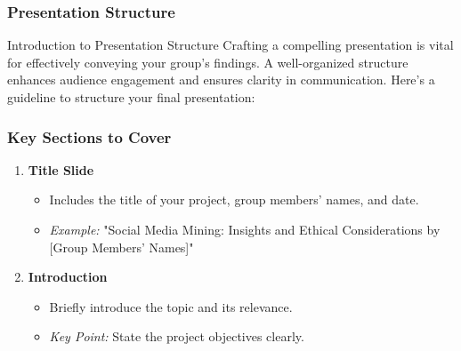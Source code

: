 \documentclass{beamer}
\begin{document}
\begin{frame}[fragile]
    \frametitle{Presentation Structure}
    \begin{block}{Introduction to Presentation Structure}
        Crafting a compelling presentation is vital for effectively conveying your group’s findings. 
        A well-organized structure enhances audience engagement and ensures clarity in communication.
        Here's a guideline to structure your final presentation:
    \end{block}
\end{frame}

\begin{frame}[fragile]
    \frametitle{Key Sections to Cover}
    \begin{enumerate}
        \item \textbf{Title Slide}
            \begin{itemize}
                \item Includes the title of your project, group members' names, and date.
                \item \textit{Example:} "Social Media Mining: Insights and Ethical Considerations by [Group Members' Names]"
            \end{itemize}
        
        \item \textbf{Introduction}
            \begin{itemize}
                \item Briefly introduce the topic and its relevance.
                \item \textit{Key Point:} State the project objectives clearly.
            \end{itemize}
    \end{enumerate}
\end{frame}
\end{document}

